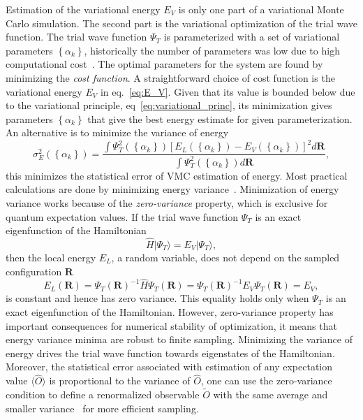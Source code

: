 \documentclass[final,3p,times,twocolumn]{elsarticle}
\begin{document}
	Estimation of the variational energy $E_V$ is only one part of a variational Monte Carlo simulation. The second part is the variational optimization of the trial wave function. The trial wave function $\Psi_T$ is parameterized with a set of variational parameters $\left\{\alpha_k\right\}$, historically the number of parameters was low due to high computational cost~\cite{foulkes2001quantum}. The optimal parameters for the system are found by minimizing the \emph{cost function}. A straightforward choice of cost function is the variational energy $E_V$ in eq.~\eqref{eq:E_V}. Given that its value is bounded below due to the variational principle, eq~\eqref{eq:variational_princ}, its minimization gives parameters $\left\{\alpha_k\right\}$ that give the best energy estimate for given parameterization. An alternative is to minimize the variance of energy
	\begin{equation}
		\sigma_{E}^{2}(\left\{\alpha_k\right\})=\frac{\int \Psi_{T}^{2}(\left\{\alpha_k\right\})\left[E_{L}(\left\{\alpha_k\right\})-E_{V}(\left\{\alpha_k\right\})\right]^{2} d \mathbf{R}}{\int \Psi_{T}^{2}(\left\{\alpha_k\right\}) d \mathbf{R}},
	\end{equation}	
	this minimizes the statistical error of VMC estimation of energy. Most practical calculations are done by minimizing energy variance~\cite{foulkes2001quantum}. Minimization of energy variance works because of the \emph{zero-variance} property, which is exclusive for quantum expectation values. If the trial wave function $\Psi_{T}$ is an exact eigenfunction of the Hamiltonian
	\begin{equation}
		\hat H |\Psi_{T}\rangle = E_V |\Psi_{T}\rangle,
	\end{equation}
	then the local energy $E_L$, a random variable, does not depend on the sampled configuration $\mathbf{R}$ 
	\begin{equation}				
		E_{L}(\mathbf{R})=\Psi_{T}(\mathbf{R})^{-1} \hat{H} \Psi_{T}(\mathbf{R}) = \Psi_{T}(\mathbf{R})^{-1} E_V \Psi_{T}(\mathbf{R}) = E_V,
	\end{equation}
	is constant and hence has zero variance. This equality holds only when $\Psi_{T}$ is an exact eigenfunction of the Hamiltonian. However, zero-variance property has important consequences for numerical stability of optimization, it means that energy variance minima are robust to finite sampling. Minimizing the variance of energy drives the trial wave function towards eigenstates of the Hamiltonian. Moreover, the statistical error associated with estimation of any expectation value $\langle \hat O \rangle$ is proportional to the variance of $\hat O$, one can use the zero-variance condition to define a renormalized observable $\tilde O$ with the same average and smaller variance~\cite{assaraf1999zero} for more efficient sampling. 
\end{document}
